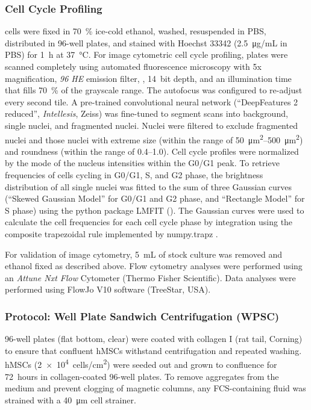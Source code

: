 \subsubsection*{Cell Cycle Profiling}
\INA cells were fixed in \SI{70}{\percent} ice-cold ethanol, washed,
resuspended in PBS, distributed in 96-well plates, and stained with Hoechst
33342 (\SI{2.5}{\micro\gram/mL} in PBS) for \SI{1}{\hour} at
\SI{37}{\degreeCelsius}. For image cytometric cell cycle profiling, plates were
scanned completely using automated fluorescence microscopy with
5x magnification, \textit{96 HE} emission filter, , \SI{14}{bit}
depth, and an illumination time that fills \SI{70}{\percent} of the grayscale
range. The autofocus was configured to re-adjust every second tile. A
pre-trained convolutional neural network (“DeepFeatures 2 reduced”,  \textit{Intellesis},
Zeiss) was fine-tuned to segment scans into background, single nuclei, and
fragmented nuclei. Nuclei were filtered to exclude fragmented nuclei and those
nuclei with extreme size (within the range of
\SIrange{50}{500}{\micro\meter\squared}) and roundness (within the range of
\numrange{0.4}{1.0}). Cell cycle profiles were normalized by the mode of the
nucleus intensities within the G0/G1 peak. To retrieve frequencies of cells
cycling in G0/G1, S, and G2 phase, the brightness distribution of all single
nuclei was fitted to the sum of three Gaussian curves (“Skewed Gaussian Model”
for G0/G1 and G2 phase, and “Rectangle Model” for S phase) using the python
package LMFIT \cite{newvilleLMFITNonLinearLeastSquare2014} ().
The Gaussian curves were used to calculate the cell frequencies for each cell
cycle phase by integration using the composite trapezoidal rule implemented by
numpy.trapz \cite{harrisArrayProgrammingNumPy2020}.

For validation of image cytometry, \SI{5}{mL} of \INA stock culture was removed
and ethanol fixed as described above. Flow cytometry analyses were performed
using an \textit{Attune Nxt Flow} Cytometer (Thermo Fisher Scientific). Data analyses
were performed using FlowJo V10 software (TreeStar, USA).


\subsubsection*{Protocol: Well Plate Sandwich Centrifugation (WPSC)}
96-well plates (flat bottom, clear) were coated with collagen I (rat tail,
Corning) to ensure that confluent hMSCs withstand centrifugation and
repeated washing. hMSCs (\SI{2e4}{cells/cm^2}) were seeded out and grown to
confluence for \SI{72}{hours} in collagen-coated 96-well plates. To remove
aggregates from the medium and prevent clogging of magnetic columns, any
FCS-containing fluid was strained with a \SI{40}{\micro\meter} cell
strainer.

